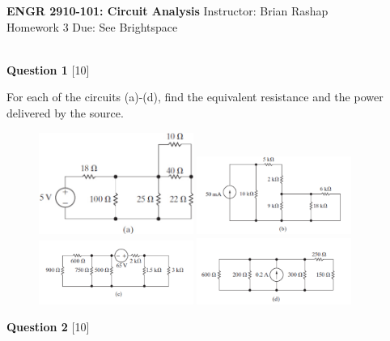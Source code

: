 \documentclass[12pt]{article}
\begin{document}
\begin{center}
\hfil
{\large\bf {ENGR 2910-101: Circuit Analysis}}
\hfill Instructor: Brian Rashap\\
Homework 3 \hfill Due: See Brightspace\\
\hrulefill\\
\end{center}

{\bf Question 1} [10] %

For each of the circuits (a)-(d), find the equivalent resistance and the power delivered by the source. 
\begin{figure}[h!]
  \centering 
 \vspace{-0.1in}
 \includegraphics[clip,width=0.45\textwidth]{Fig3-3a.png}
 \includegraphics[clip,width=0.45\textwidth]{Fig3-3b.png}\\
 \includegraphics[clip,width=0.45\textwidth]{Fig3-3c.png}
 \includegraphics[clip,width=0.45\textwidth]{Fig3-3d.png}
\end{figure}

\vspace{0.1in}
\noindent
{\bf Question 2} [10] %
\end{document}
